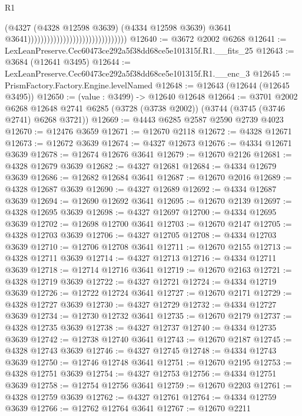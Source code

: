 \begin{lexlean}{R1}
\begin{coremodule}
                                                                (@4327
                                                                  (@4328 @12598 @3639)
                                                                  (@4334 @12598 @3639)
                                                                  @3641
                                                                  @3641)))))))))))))))))))))))))))))))
@12640 := @3672 @2002 @6268
@12641 := LexLeanPreserve.Cec60473ce292a5f38dd68ce5e101315f.R1.__fits_25
@12643 := @3684 (@12641 @3495)
@12644 := LexLeanPreserve.Cec60473ce292a5f38dd68ce5e101315f.R1.__enc_3
@12645 := PrismFactory.Factory.Engine.levelNamed
@12648 := @12643 (@12644 (@12645 @3495))
@12650 := (value : @3499) -> @12640 @12648
@12664 := @3701
    @2002
    @6268
    @12648
    @2741
    @6285
    (@3728 (@3738 @2002))
    (@3744 (@3745 (@3746 @2741) @6268 @3721))
@12669 := @4443 @6285 @2587 @2590 @2739 @4023
@12670 := @12476 @3659
@12671 := @12670 @2118
@12672 := @4328 @12671
@12673 := @12672 @3639
@12674 := @4327 @12673
@12676 := @4334 @12671 @3639
@12678 := @12674 @12676 @3641
@12679 := @12670 @2126
@12681 := @4328 @12679 @3639
@12682 := @4327 @12681
@12684 := @4334 @12679 @3639
@12686 := @12682 @12684 @3641
@12687 := @12670 @2016
@12689 := @4328 @12687 @3639
@12690 := @4327 @12689
@12692 := @4334 @12687 @3639
@12694 := @12690 @12692 @3641
@12695 := @12670 @2139
@12697 := @4328 @12695 @3639
@12698 := @4327 @12697
@12700 := @4334 @12695 @3639
@12702 := @12698 @12700 @3641
@12703 := @12670 @2147
@12705 := @4328 @12703 @3639
@12706 := @4327 @12705
@12708 := @4334 @12703 @3639
@12710 := @12706 @12708 @3641
@12711 := @12670 @2155
@12713 := @4328 @12711 @3639
@12714 := @4327 @12713
@12716 := @4334 @12711 @3639
@12718 := @12714 @12716 @3641
@12719 := @12670 @2163
@12721 := @4328 @12719 @3639
@12722 := @4327 @12721
@12724 := @4334 @12719 @3639
@12726 := @12722 @12724 @3641
@12727 := @12670 @2171
@12729 := @4328 @12727 @3639
@12730 := @4327 @12729
@12732 := @4334 @12727 @3639
@12734 := @12730 @12732 @3641
@12735 := @12670 @2179
@12737 := @4328 @12735 @3639
@12738 := @4327 @12737
@12740 := @4334 @12735 @3639
@12742 := @12738 @12740 @3641
@12743 := @12670 @2187
@12745 := @4328 @12743 @3639
@12746 := @4327 @12745
@12748 := @4334 @12743 @3639
@12750 := @12746 @12748 @3641
@12751 := @12670 @2195
@12753 := @4328 @12751 @3639
@12754 := @4327 @12753
@12756 := @4334 @12751 @3639
@12758 := @12754 @12756 @3641
@12759 := @12670 @2203
@12761 := @4328 @12759 @3639
@12762 := @4327 @12761
@12764 := @4334 @12759 @3639
@12766 := @12762 @12764 @3641
@12767 := @12670 @2211

\end{coremodule}
\end{lexlean}
